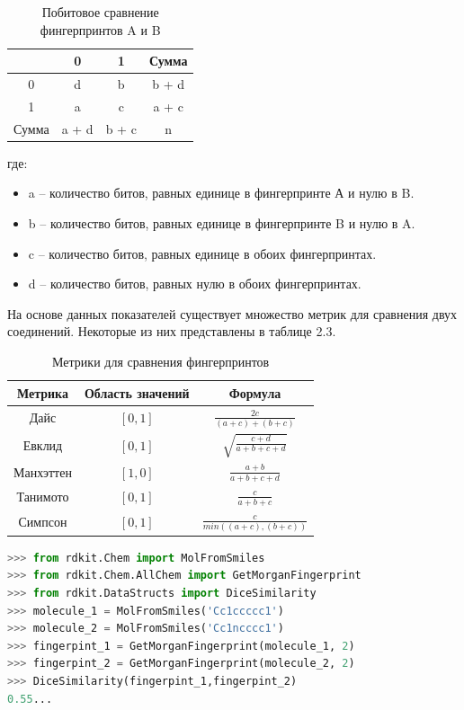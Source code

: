 \documentclass[a4paper,14pt]{extreport}
\begin{document}
\begin{table}[H]
\caption{Побитовое сравнение фингерпринтов A и B}
\begin{center}
\begin{tabular}{|c|c|c|c|}
\hline
	& 0 & 1 & Сумма\\
\hline
	0 & d & b & b + d\\
\hline
	1 & a & c & a + c\\
\hline
	Сумма & a + d& b + c & n\\
\hline
\end{tabular}

\end{center}
где:
\begin{itemize}
\item a – количество битов, равных единице в фингерпринте А и нулю в B.

\item b – количество битов, равных единице в фингерпринте B и нулю в A.

\item c – количество битов, равных единице в обоих фингерпринтах.

\item d – количество битов, равных нулю в обоих фингерпринтах.
\end{itemize}
\end{table}
На основе данных показателей существует множество метрик для сравнения двух соединений. Некоторые из них представлены в таблице 2.3.
\begin{table}[H]
\caption{Метрики для сравнения фингерпринтов}
\begin{center}
\begin{tabular}{|c|c|c|}
\hline
	Метрика & Область значений & Формула\\[2ex]
\hline
	Дайс & $[0, 1]$ & $\frac{2c}{(a+c)+(b+c)}$\\[5ex]
\hline
	Евклид & $[0, 1]$ & $\sqrt{\frac{c + d}{a + b + c + d}}$\\[5ex]
\hline
	Манхэттен & $[1, 0]$ & $\frac{a + b}{a + b + c + d}$\\[5ex]
\hline
	Танимото & $[0, 1]$ & $\frac{c}{a + b + c}$\\[5ex]
\hline
	Симпсон & $[0, 1]$ & $\frac{c}{min((a+c),(b+c))}$\\[5ex]
\hline
\end{tabular}
\end{center}
\end{table}
\newpage
\begin{lstlisting}[language=Python, caption=Использование метрики Дайса и библиотеки RDKit для сравнения двух фингерпринтов Моргана]
>>> from rdkit.Chem import MolFromSmiles
>>> from rdkit.Chem.AllChem import GetMorganFingerprint
>>> from rdkit.DataStructs import DiceSimilarity
>>> molecule_1 = MolFromSmiles('Cc1ccccc1')
>>> molecule_2 = MolFromSmiles('Cc1ncccc1')
>>> fingerpint_1 = GetMorganFingerprint(molecule_1, 2)
>>> fingerpint_2 = GetMorganFingerprint(molecule_2, 2)
>>> DiceSimilarity(fingerpint_1,fingerpint_2)
0.55...
\end{lstlisting}
\end{document}
